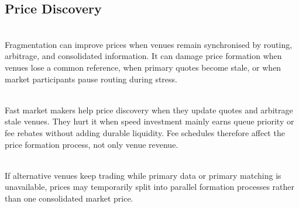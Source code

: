 \subsection{Price Discovery}


\begin{mechanism} \\
Fragmentation can improve prices when venues remain synchronised by routing, arbitrage, and consolidated information. It can damage price formation when venues lose a common reference, when primary quotes become stale, or when market participants pause routing during stress.
\end{mechanism}

\begin{mechanism} \\
Fast market makers help price discovery when they update quotes and arbitrage stale venues. They hurt it when speed investment mainly earns queue priority or fee rebates without adding durable liquidity. Fee schedules therefore affect the price formation process, not only venue revenue.
\end{mechanism}

\begin{caveat} \\
If alternative venues keep trading while primary data or primary matching is unavailable, prices may temporarily split into parallel formation processes rather than one consolidated market price.
\end{caveat}
